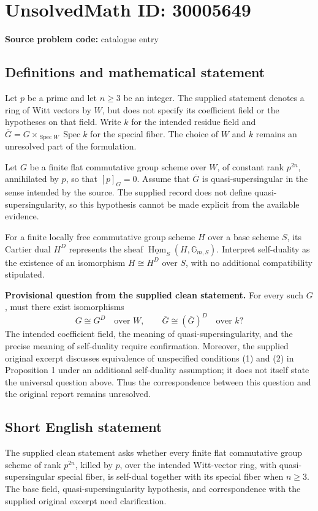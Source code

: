 \documentclass[11pt]{article}
\begin{document}
\section*{UnsolvedMath ID: 30005649}
\textbf{Source problem code:} catalogue entry
\subsection{Definitions and mathematical statement}
Let \(p\) be a prime and let \(n\geq 3\) be an integer. The supplied statement denotes a ring of Witt vectors by \(W\), but does not specify its coefficient field or the hypotheses on that field. Write \(k\) for the intended residue field and \(\overline G=G\times_{\operatorname{Spec}W}\operatorname{Spec}k\) for the special fiber. The choice of \(W\) and \(k\) remains an unresolved part of the formulation.

Let \(G\) be a finite flat commutative group scheme over \(W\), of constant rank \(p^{2n}\), annihilated by \(p\), so that \([p]_G=0\). Assume that \(\overline G\) is quasi-supersingular in the sense intended by the source. The supplied record does not define quasi-supersingularity, so this hypothesis cannot be made explicit from the available evidence.

For a finite locally free commutative group scheme \(H\) over a base scheme \(S\), its Cartier dual \(H^D\) represents the sheaf \(\underline{\operatorname{Hom}}_S(H,\mathbb G_{m,S})\). Interpret self-duality as the existence of an isomorphism \(H\cong H^D\) over \(S\), with no additional compatibility stipulated.

\textbf{Provisional question from the supplied clean statement.} For every such \(G\), must there exist isomorphisms
\[
G\cong G^D\quad\text{over }W,
\qquad
\overline G\cong(\overline G)^D\quad\text{over }k?
\]
The intended coefficient field, the meaning of quasi-supersingularity, and the precise meaning of self-duality require confirmation. Moreover, the supplied original excerpt discusses equivalence of unspecified conditions (1) and (2) in Proposition 1 under an additional self-duality assumption; it does not itself state the universal question above. Thus the correspondence between this question and the original report remains unresolved.
\subsection{Short English statement}
The supplied clean statement asks whether every finite flat commutative group scheme of rank \(p^{2n}\), killed by \(p\), over the intended Witt-vector ring, with quasi-supersingular special fiber, is self-dual together with its special fiber when \(n\geq3\). The base field, quasi-supersingularity hypothesis, and correspondence with the supplied original excerpt need clarification.
\end{document}
